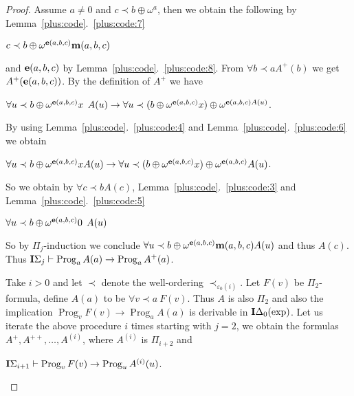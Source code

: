 \documentclass[8pt]{article}
\theoremstyle{definition}
\theoremstyle{definition}
\theoremstyle{definition}
\theoremstyle{definition}
\theoremstyle{definition}
\theoremstyle{definition}
\theoremstyle{definition}
\theoremstyle{definition}
\theoremstyle{definition}
\theoremstyle{definition}
\theoremstyle{definition}
\theoremstyle{definition}
\theoremstyle{definition}
\theoremstyle{question}
\begin{document}
\begin{proof}
  Assume $a \neq 0$ and $c \prec b \oplus \omega^a$, then we obtain the following by Lemma~\ref{plus:code}.~\ref{plus:code:7}
  \begin{center}
  $c \prec b \oplus \omega^{{\bf e}(a, b, c)}{\bf m}(a, b, c)$
  \end{center}
  and ${\bf e}(a, b, c)$ by Lemma~\ref{plus:code}.~\ref{plus:code:8}. From $\forall b \prec a A^{+}(b)$
  we get $A^+({\bf e}(a, b, c))$. By the definition of $A^+$ we have
  \begin{center}
    $\forall u \prec b \oplus \omega^{{\bf e}(a,b,c)} x \:\: A(u) 
    \to \forall u \prec (b \oplus \omega^{{\bf e}(a,b,c)} x) \oplus \omega^{{\bf e}(a, b, c) A(u)}$.
  \end{center}
  By using Lemma~\ref{plus:code}.~\ref{plus:code:4} and Lemma~\ref{plus:code}.~\ref{plus:code:6} we obtain
  \begin{center}
    $\forall u \prec b \oplus \omega^{{\bf e}(a,b,c)} x A (u)
    \to \forall u \prec (b \oplus \omega^{{\bf e}(a,b,c)}x) \oplus \omega^{{\bf e}(a, b, c)} A(u)$.
  \end{center}
  So we obtain by $\forall c \prec b A(c)$, Lemma~\ref{plus:code}.~\ref{plus:code:3} and Lemma~\ref{plus:code}.~\ref{plus:code:5}
  \begin{center}
    $\forall u \prec b \oplus \omega^{{\bf e}(a,b,c)}0 \:\: A(u)$
  \end{center}
  So by $\Pi_j$-induction we conclude $\forall u \prec b \oplus \omega^{{\bf e}(a,b,c)} {\bf m}(a,b,c) A(u)$
  and thus $A(c)$. Thus ${\bf I}\Sigma_j \vdash \operatorname{Prog}_a A(a) \to \operatorname{Prog}_a A^+(a)$.

  Take $i > 0$ and let $\prec$ denote the well-ordering $\prec_{\varepsilon_0(i)}$.
  Let $F(v)$ be $\Pi_2$-formula, define $A(a)$ to be $\forall v \prec a \: F(v)$. Thus $A$ is also $\Pi_2$
  and also the implication $\operatorname{Prog}_vF(v) \to \operatorname{Prog}_a A(a)$ is derivable
  in ${\bf I}\Delta_0(\operatorname{exp})$. Let us iterate the above procedure $i$ times starting with $j = 2$,
  we obtain the formulas $A^+, A^{++}, \ldots, A^{(i)}$, where $A^{(i)}$ is $\Pi_{i + 2}$ and
  \begin{center}
    ${\bf I}\Sigma_{i + 1} \vdash \operatorname{Prog}_v F(v) \to \operatorname{Prog}_u A^{(i)} (u)$.
  \end{center}


\end{proof}
\end{document}
